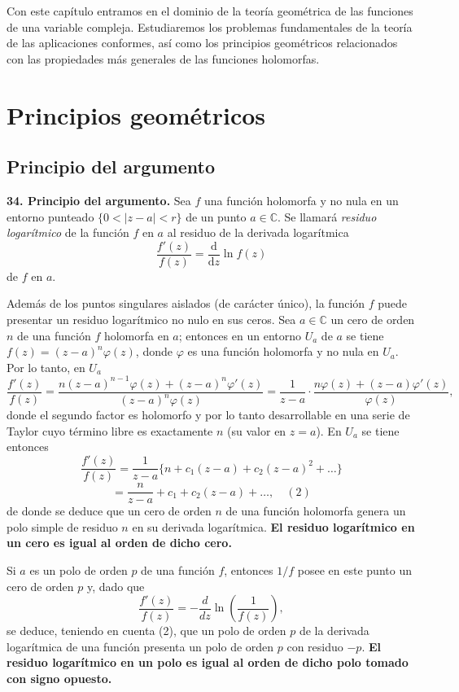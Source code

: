 \documentclass{article}
\begin{document}
Con este capítulo entramos en el dominio de la teoría geométrica de las funciones de una variable compleja. Estudiaremos los problemas fundamentales de la teoría de las aplicaciones conformes, así como los principios geométricos relacionados con las propiedades más generales de las funciones holomorfas.

\section*{Principios geométricos}

\subsection*{Principio del argumento}
\textbf{34. Principio del argumento.} Sea \( f \) una función holomorfa y no nula en un entorno punteado \( \{ 0 < |z - a| < r \} \) de un punto \( a \in \mathbb{C} \). Se llamará \textit{residuo logarítmico} de la función \( f \) en \( a \) al residuo de la derivada logarítmica  
\[
\frac{f'(z)}{f(z)} = \frac{\mathrm{d}}{\mathrm{d}z} \ln f(z)
\]
de \( f \) en \( a \).  

Además de los puntos singulares aislados (de carácter único), la función \( f \) puede presentar un residuo logarítmico no nulo en sus ceros.  
Sea \( a \in \mathbb{C} \) un cero de orden \( n \) de una función \( f \) holomorfa en \( a \); entonces en un entorno \( U_a \) de \( a \) se tiene \( f(z) = (z - a)^n \varphi(z) \), donde \( \varphi \) es una función holomorfa y no nula en \( U_a \). Por lo tanto, en \( U_a \)  
\[
\frac{f'(z)}{f(z)} = \frac{n (z - a)^{n-1} \varphi(z) + (z - a)^n \varphi'(z)}{(z - a)^n \varphi(z)} = \frac{1}{z-a} \cdot \frac{n \varphi(z) + (z-a) \varphi'(z)}{\varphi(z)},
\]
donde el segundo factor es holomorfo y por lo tanto desarrollable en una serie de Taylor cuyo término libre es exactamente \( n \) (su valor en \( z = a \)). En \( U_a \) se tiene entonces  
\[
\frac{f'(z)}{f(z)} = \frac{1}{z-a} \{ n + c_1 (z - a) + c_2 (z - a)^2 + \dots \}
\]
\[
= \frac{n}{z-a} + c_1 + c_2 (z - a) + \dots, \quad (2)
\]
de donde se deduce que un cero de orden \( n \) de una función holomorfa genera un polo simple de residuo \( n \) en su derivada logarítmica.  
\textbf{El residuo logarítmico en un cero es igual al orden de dicho cero.}  

Si \( a \) es un polo de orden \( p \) de una función \( f \), entonces \( 1/f \) posee en este punto un cero de orden \( p \) y, dado que  
\[
\frac{f'(z)}{f(z)} = - \frac{d}{dz} \ln \left(\frac{1}{f(z)}\right),
\]
se deduce, teniendo en cuenta (2), que un polo de orden \( p \) de la derivada logarítmica de una función presenta un polo de orden \( p \) con residuo \( -p \).  
\textbf{El residuo logarítmico en un polo es igual al orden de dicho polo tomado con signo opuesto.}  
\end{document}
